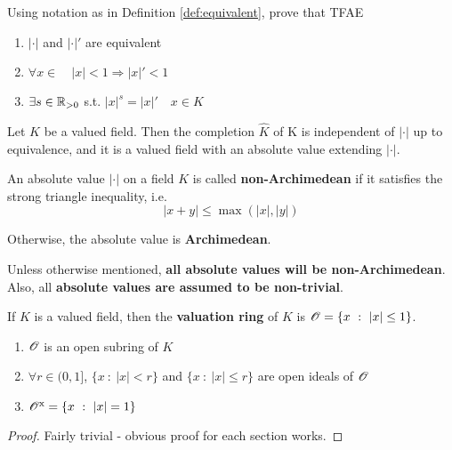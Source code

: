 \documentclass[a4paper]{article}
\begin{document}
{\begin{exer-num}
	Using notation as in Definition \ref{def:equivalent}, prove that TFAE
	
	\begin{enumerate}
		\item $|\cdot|$ and $|\cdot|'$ are equivalent\\
		\item $\forall x\in\quad|x|<1\Rightarrow|x|'<1$\\
		\item $\exists s\in\mathbb{R}_{>0}$ s.t. $|x|^s=|x|'\quad x\in K$
	\end{enumerate}
\end{exer-num}

\begin{exer-num}
	Let $K$ be a valued field. Then the completion $\hat{K}$ of K is independent of $|\cdot|$ up to equivalence, and it is a valued field with an absolute value extending $|\cdot|$.
\end{exer-num}

\begin{defi-num}[Archimedean]
	An absolute value $|\cdot|$ on a field $K$ is called \textbf{non-Archimedean} if it satisfies the strong triangle inequality, i.e.
	\[
		|x+y|\leq \max(|x|,|y|)
	\]
	
	Otherwise, the absolute value is \textbf{Archimedean}.
\end{defi-num}

Unless otherwise mentioned, \textbf{all absolute values will be non-Archimedean}. Also, all \textbf{absolute values are assumed to be non-trivial}.

\begin{defi}
	If $K$ is a valued field, then the \textbf{valuation ring} of $K$ is $\mathscr{O}=\{x\ :\ |x|\leq 1\}$.
\end{defi}

\begin{prop-num}
	\begin{enumerate}
		\item $\mathscr{O}$ is an open subring of $K$\\
		\item $\forall r\in(0,1]$, $\{x\ :\ |x|<r\}$ and $\{x\ :\ |x|\leq r\}$ are open ideals of $\mathscr{O}$\\
		\item $\calO^{\mathrm{x}}=\{x\ :\ |x|=1\}$
	\end{enumerate}
\end{prop-num}
\begin{proof}
	Fairly trivial - obvious proof for each section works.
\end{proof}

}
\end{document}
